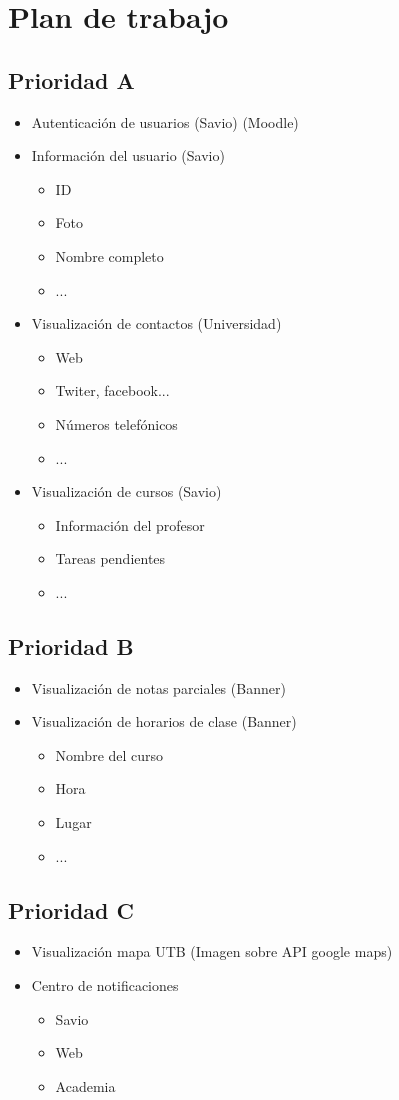 \section{Plan de trabajo}

\subsection{Prioridad A}
\begin{itemize}
 \item Autenticación de usuarios (Savio) (Moodle)
 \item Información del usuario (Savio)
    \begin{itemize}
         \item ID
         \item Foto
         \item Nombre completo
         \item ...
    \end{itemize}
 \item Visualización de contactos (Universidad)
  \begin{itemize}
         \item Web
         \item Twiter, facebook...
         \item Números telefónicos
         \item ...
    \end{itemize}
 \item Visualización de cursos (Savio)
   \begin{itemize}
         \item Información del profesor
         \item Tareas pendientes
         \item ...
    \end{itemize}
\end{itemize}


\subsection{Prioridad B}
\begin{itemize}
 \item Visualización de notas parciales (Banner)
 \item Visualización de horarios de clase (Banner)
 \begin{itemize}
        \item Nombre del curso
        \item Hora
        \item Lugar
         \item ...
    \end{itemize}
\end{itemize}

\subsection{Prioridad C}
\begin{itemize}
 \item Visualización mapa UTB (Imagen sobre API google maps)
 \item Centro de notificaciones
     \begin{itemize}
         \item Savio
         \item Web
         \item Academia
    \end{itemize}
\end{itemize}